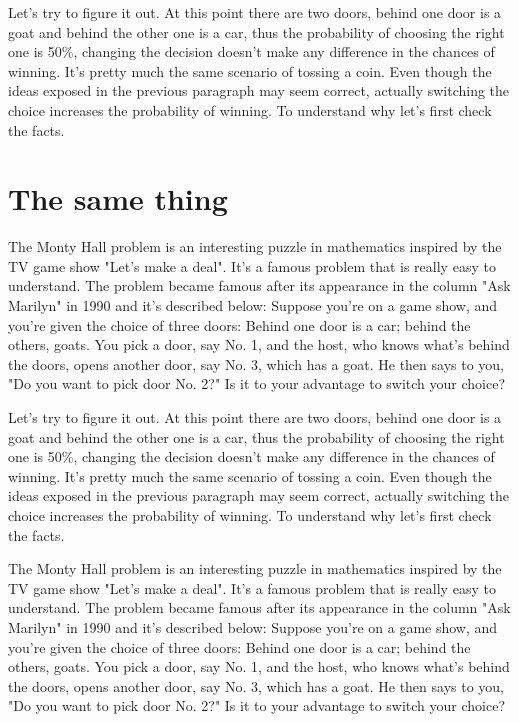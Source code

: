 \documentclass{oscmjournal}
\begin{document}
Let's try to figure it out. At this point there are two doors, behind one door is a goat  and behind the other one is a car, thus the probability of choosing the right one is 50\%, changing the decision doesn't make any difference in the chances of winning. It's pretty much the same scenario of tossing a coin. Even though the ideas exposed in the previous paragraph may seem correct, actually switching the choice increases the probability of winning. To understand why let's  first check the facts.


\section{The same thing}

The Monty Hall problem is an interesting puzzle in mathematics inspired by the TV  game show "Let's make a deal". It's a famous problem that is really easy to understand. The problem became famous after its appearance in the column "Ask Marilyn" in 1990 and  it's described below: Suppose you're on a game show, and you're given the choice of three doors: Behind one  door is a car; behind the others, goats. You pick a door, say No. 1, and the host, who  knows what's behind the doors, opens another door, say No. 3, which has a goat. He then  says to you, "Do you want to pick door No. 2?" Is it to your advantage to switch your choice?

Let's try to figure it out. At this point there are two doors, behind one door is a goat  and behind the other one is a car, thus the probability of choosing the right one is 50\%, changing the decision doesn't make any difference in the chances of winning. It's pretty much the same scenario of tossing a coin. Even though the ideas exposed in the previous paragraph may seem correct, actually switching the choice increases the probability of winning. To understand why let's  first check the facts.

The Monty Hall problem is an interesting puzzle in mathematics inspired by the TV  game show "Let's make a deal". It's a famous problem that is really easy to understand. The problem became famous after its appearance in the column "Ask Marilyn" in 1990 and  it's described below: Suppose you're on a game show, and you're given the choice of three doors: Behind one  door is a car; behind the others, goats. You pick a door, say No. 1, and the host, who  knows what's behind the doors, opens another door, say No. 3, which has a goat. He then  says to you, "Do you want to pick door No. 2?" Is it to your advantage to switch your choice?
\end{document}
